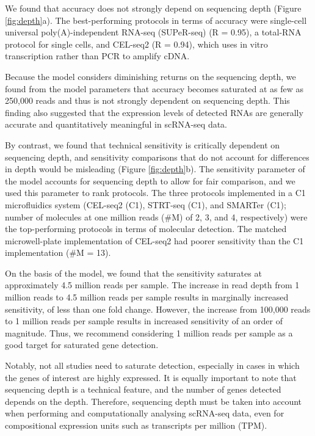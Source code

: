 We found that accuracy does not strongly depend on sequencing depth (Figure \ref{fig:depth}a). The best-performing protocols in terms of accuracy were single-cell universal poly(A)-independent RNA-seq (SUPeR-seq) (R = 0.95), a total-RNA protocol for single cells, and CEL-seq2 (R = 0.94), which uses in vitro transcription rather than PCR to amplify cDNA.

Because the model considers diminishing returns on the sequencing depth, we found from the model parameters that accuracy becomes saturated at as few as 250,000 reads and thus is not strongly dependent on sequencing depth. This finding also suggested that the expression levels of detected RNAs are generally accurate and quantitatively meaningful in scRNA-seq data.

By contrast, we found that technical sensitivity is critically dependent on sequencing depth, and sensitivity comparisons that do not account for differences in depth would be misleading (Figure \ref{fig:depth}b). The sensitivity parameter of the model accounts for sequencing depth to allow for fair comparison, and we used this parameter to rank protocols. The three protocols implemented in a C1 microfluidics system (CEL-seq2 (C1), STRT-seq (C1), and SMARTer (C1); number of molecules at one million reads (\#M) of 2, 3, and 4, respectively) were the top-performing protocols in terms of molecular detection. The matched microwell-plate implementation of CEL-seq2 had poorer sensitivity than the C1 implementation (\#M = 13).

On the basis of the model, we found that the sensitivity saturates at approximately 4.5 million reads per sample. The increase in read depth from 1 million reads to 4.5 million reads per sample results in marginally increased sensitivity, of less than one fold change. However, the increase from 100,000 reads to 1 million reads per sample results in increased sensitivity of an order of magnitude. Thus, we recommend considering 1 million reads per sample as a good target for saturated gene detection.

Notably, not all studies need to saturate detection, especially in cases in which the genes of interest are highly expressed. It is equally important to note that sequencing depth is a technical feature, and the number of genes detected depends on the depth. Therefore, sequencing depth must be taken into account when performing and computationally analysing scRNA-seq data, even for compositional expression units such as transcripts per million (TPM).

